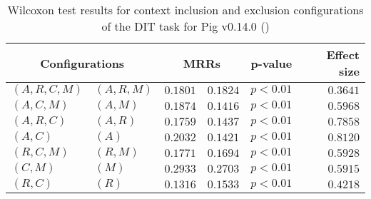
\begin{table}
\begin{spacing}{1.2}
\centering
\caption{Wilcoxon test results for context inclusion and exclusion configurations of the DIT task for Pig v0.14.0 (\ctwo)}
\label{table:versus-wilcox-pig-dit-context}
\begin{tabular}{ll|rr|rr}
\toprule
      \multicolumn{2}{c|}{Configurations} &                \multicolumn{2}{c|}{MRRs} &             p-value & Effect size \\
\midrule
 $(A,R,C,M)$ &  $(A,R,M)$ &       $0.1801$ &  $\bm{0.1824}$ & $p<0.01$ &    $0.3641$ \\
   $(A,C,M)$ &    $(A,M)$ &  $\bm{0.1874}$ &       $0.1416$ & $p<0.01$ &    $0.5968$ \\
   $(A,R,C)$ &    $(A,R)$ &  $\bm{0.1759}$ &       $0.1437$ & $p<0.01$ &    $0.7858$ \\
     $(A,C)$ &      $(A)$ &  $\bm{0.2032}$ &       $0.1421$ & $p<0.01$ &    $0.8120$ \\
   $(R,C,M)$ &    $(R,M)$ &  $\bm{0.1771}$ &       $0.1694$ & $p<0.01$ &    $0.5928$ \\
     $(C,M)$ &      $(M)$ &  $\bm{0.2933}$ &       $0.2703$ & $p<0.01$ &    $0.5915$ \\
     $(R,C)$ &      $(R)$ &       $0.1316$ &  $\bm{0.1533}$ & $p<0.01$ &    $0.4218$ \\
\bottomrule
\end{tabular}

\end{spacing}
\end{table}

